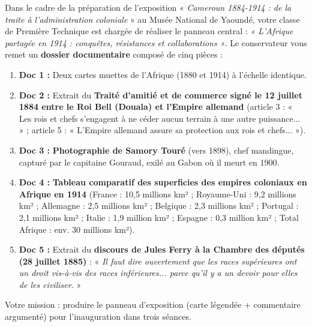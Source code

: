 \documentclass[11pt]{article}
\begin{document}
Dans le cadre de la préparation de l'exposition « \emph{Cameroun 1884-1914 : de la traite à l'administration coloniale} » au Musée National de Yaoundé, votre classe de Première Technique est chargée de réaliser le panneau central : \emph{« L'Afrique partagée en 1914 : conquêtes, résistances et collaborations »}. Le conservateur vous remet un \textbf{dossier documentaire} composé de cinq pièces :
\begin{enumerate}
    \item \textbf{Doc 1 :} Deux cartes muettes de l'Afrique (1880 et 1914) à l'échelle identique.
    \item \textbf{Doc 2 :} Extrait du \textbf{Traité d'amitié et de commerce signé le 12 juillet 1884 entre le Roi Bell (Douala) et l'Empire allemand} (article 3 : « Les rois et chefs s'engagent à ne céder aucun terrain à une autre puissance... » ; article 5 : « L'Empire allemand assure sa protection aux rois et chefs... »).
    \item \textbf{Doc 3 :} \textbf{Photographie de Samory Touré} (vers 1898), chef mandingue, capturé par le capitaine Gouraud, exilé au Gabon où il meurt en 1900.
    \item \textbf{Doc 4 :} \textbf{Tableau comparatif des superficies des empires coloniaux en Afrique en 1914} (France : 10,5 millions km² ; Royaume-Uni : 9,2 millions km² ; Allemagne : 2,5 millions km² ; Belgique : 2,3 millions km² ; Portugal : 2,1 millions km² ; Italie : 1,9 million km² ; Espagne : 0,3 million km² ; Total Afrique : env. 30 millions km²).
    \item \textbf{Doc 5 :} Extrait du \textbf{discours de Jules Ferry à la Chambre des députés (28 juillet 1885)} : « \emph{Il faut dire ouvertement que les races supérieures ont un droit vis-à-vis des races inférieures... parce qu'il y a un devoir pour elles de les civiliser.} »
\end{enumerate}
Votre mission : produire le panneau d'exposition (carte légendée + commentaire argumenté) pour l'inauguration dans trois séances.
\end{document}

